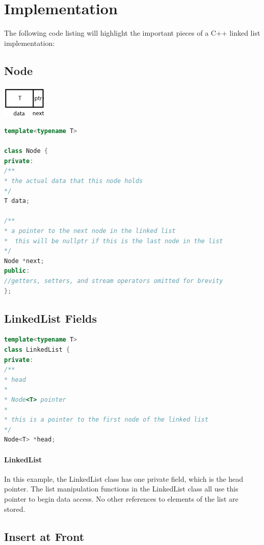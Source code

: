 \documentclass[12pt]{article}
\begin{document}
\newpage

\section{Implementation}

The following code listing will highlight the important pieces of a C++ linked list implementation:

\subsection{Node}

\includegraphics{node_diagram}

\begin{lstlisting}[language = C++]
template<typename T>

class Node {
private:
/**
* the actual data that this node holds
*/
T data;

/**
* a pointer to the next node in the linked list
*  this will be nullptr if this is the last node in the list
*/
Node *next;
public:
//getters, setters, and stream operators omitted for brevity
};
\end{lstlisting}

\newpage

\subsection{LinkedList Fields}

\begin{lstlisting}[language = C++]
template<typename T>
class LinkedList {
private:
/**
* head
*
* Node<T> pointer
*
* this is a pointer to the first node of the linked list
*/
Node<T> *head;
\end{lstlisting}

\paragraph{LinkedList}
In this example, the LinkedList class has one private field, which is the head pointer. The list manipulation functions in the LinkedList class all use this pointer to begin data access. No other references to elements of the list are stored.
\newpage

\subsection{Insert at Front}
\end{document}
